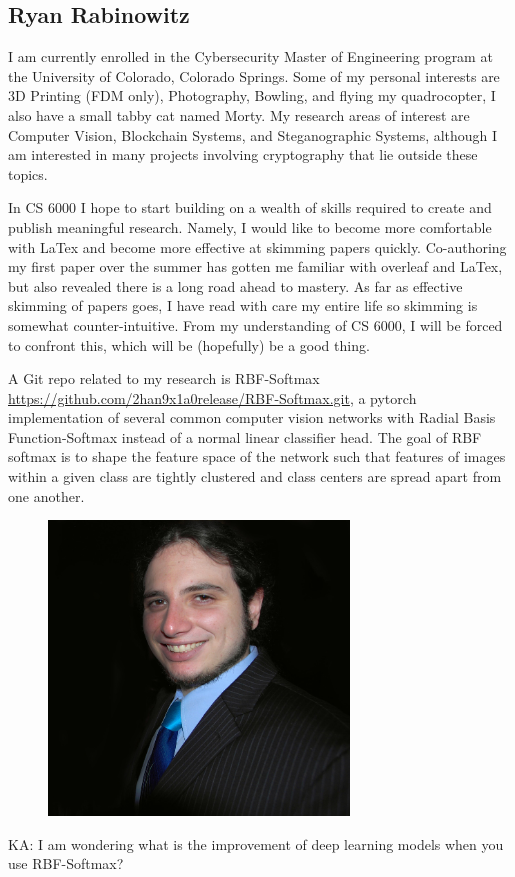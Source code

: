 \subsection{Ryan Rabinowitz}

I am currently enrolled in the Cybersecurity Master of Engineering program at the University of Colorado, Colorado Springs.
Some of my personal interests are 3D Printing (FDM only), Photography, Bowling, and flying my quadrocopter, I also have a small tabby cat named Morty. 
My research areas of interest are Computer Vision, Blockchain Systems, and Steganographic Systems, although I am interested in many projects involving cryptography that lie outside these topics. 

In CS 6000 I hope to start building on a wealth of skills required to create and publish meaningful research.
Namely, I would like to become more comfortable with LaTex and become more effective at skimming papers quickly. 
Co-authoring my first paper over the summer has gotten me familiar with overleaf and LaTex, but also revealed there is a long road ahead to mastery. 
As far as effective skimming of papers goes, I have read with care my entire life so skimming is somewhat counter-intuitive. 
From my understanding of CS 6000, I will be forced to confront this, which will be (hopefully) be a good thing.

A Git repo related to my research is RBF-Softmax \url{https://github.com/2han9x1a0release/RBF-Softmax.git}, a pytorch implementation of several common computer vision networks with Radial Basis Function-Softmax instead of a normal linear classifier head. 
The goal of RBF softmax is to shape the feature space of the network such that features of images within a given class are tightly clustered and class centers are spread apart from one another.
\begin{figure}[h]
\includegraphics[width=8cm]{Rabinowitz_Headshot.jpg}
\end{figure}

\item KA: I am wondering what is the improvement of deep learning models when you use RBF-Softmax?
